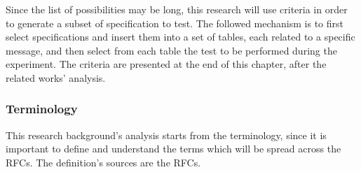 \documentclass[12pt]{article}
\begin{document}
Since the list of possibilities may be long, this research will use criteria in order to generate a subset of specification to test. The followed mechanism is to first select specifications and insert them into a set of tables, each related to a specific message, and then select from each table the test to be performed during the experiment. The criteria are presented at the end of this chapter, after the related works' analysis.

\pagebreak
\subsubsection{Terminology}
\label{subsub:terminology}

This research background's analysis starts from the terminology, since it is important to define and understand the terms which will be spread across the RFCs. The definition's sources are the RFCs.
\end{document}
